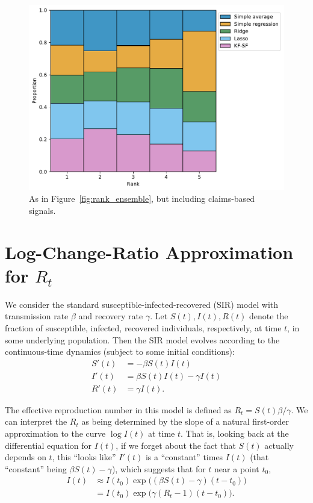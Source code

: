 \documentclass[sts]{imsart}
\theoremstyle{plain}
\theoremstyle{definition}
\theoremstyle{remark}
\begin{document}
\begin{appendix}
\begin{figure}[tb]
\centering
\includegraphics[width=0.95\linewidth]{./figures/rankplot_fusion_claims.pdf}
\caption{As in Figure~\ref{fig:rank_ensemble}, but including claims-based
  signals.} 
\label{fig:rank_ensemble_claims}
\end{figure}

\section{Log-Change-Ratio Approximation for $R_t$} 
\label{app:log_change_ratio}

We consider the standard susceptible-infected-recovered (SIR) model
\citep{Kermack:1927} with transmission rate $\beta$ and recovery rate
$\gamma$. Let $S(t),I(t),R(t)$ denote the fraction of susceptible, infected,
recovered individuals, respectively, at time $t$, in some underlying
population. Then the SIR model evolves according to the continuous-time dynamics
(subject to some initial conditions):
\begin{align*}
S'(t) &= -\beta S(t) I(t) \\
I'(t) &= \beta S(t) I(t) - \gamma I(t) \\
R'(t) &= \gamma I(t).
\end{align*} 

The effective reproduction number in this model is defined as $R_t = S(t) \beta
/ \gamma$. We can interpret the $R_t$ as being determined by
the slope of a natural first-order approximation to the curve $\log I(t)$ at
time $t$. That is, looking back at the differential equation for $I(t)$, if we
forget about the fact that $S(t)$ actually depends on $t$, this ``looks like'' 
$I'(t)$ is a ``constant'' times $I(t)$ (that ``constant'' being $\beta S(t) -
\gamma$), which suggests that for $t$ near a point $t_0$,   
\begin{align}
\nonumber
I(t) &\approx I(t_0) \exp\big( (\beta S(t) - \gamma) (t-t_0) \big) \\ 
\label{eq:inf_approx}
&= I(t_0) \exp\big(\gamma (R_t - 1) (t-t_0)\big).
\end{align}


\end{appendix}
\end{document}
